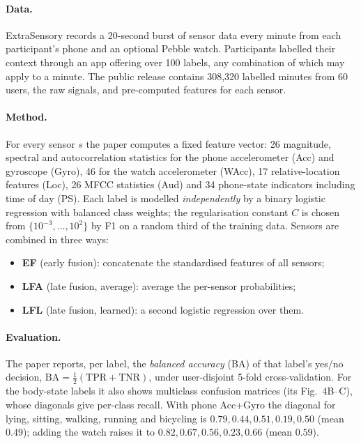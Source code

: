 \documentclass[11pt,a4paper]{article}
\begin{document}
\paragraph{Data.}
ExtraSensory \cite{vaizman2017} records a 20-second burst of sensor data every minute
from each participant's phone and an optional Pebble watch. Participants labelled their
context through an app offering over 100 labels, any combination of which may apply to a
minute. The public release contains 308{,}320 labelled minutes from 60 users, the raw
signals, and pre-computed features for each sensor.

\paragraph{Method.}
For every sensor $s$ the paper computes a fixed feature vector: 26 magnitude, spectral
and autocorrelation statistics for the phone accelerometer (Acc) and gyroscope (Gyro),
46 for the watch accelerometer (WAcc), 17 relative-location features (Loc), 26 MFCC
statistics (Aud) and 34 phone-state indicators including time of day (PS). Each label is
modelled \emph{independently} by a binary logistic regression with balanced class
weights; the regularisation constant $C$ is chosen from $\{10^{-3},\dots,10^{2}\}$ by F1
on a random third of the training data. Sensors are combined in three ways:
\begin{itemize}
\item \textbf{EF} (early fusion): concatenate the standardised features of all sensors;
\item \textbf{LFA} (late fusion, average): average the per-sensor probabilities;
\item \textbf{LFL} (late fusion, learned): a second logistic regression over them.
\end{itemize}

\paragraph{Evaluation.}
The paper reports, per label, the \emph{balanced accuracy} (BA) of that label's yes/no
decision, $\mathrm{BA}=\tfrac12(\mathrm{TPR}+\mathrm{TNR})$, under user-disjoint 5-fold
cross-validation. For the body-state labels it also shows multiclass confusion matrices
(its Fig.~4B--C), whose diagonals give per-class recall. With phone Acc+Gyro the
diagonal for lying, sitting, walking, running and bicycling is $0.79, 0.44, 0.51, 0.19,
0.50$ (mean $0.49$); adding the watch raises it to $0.82, 0.67, 0.56, 0.23, 0.66$ (mean
$0.59$).
\end{document}
